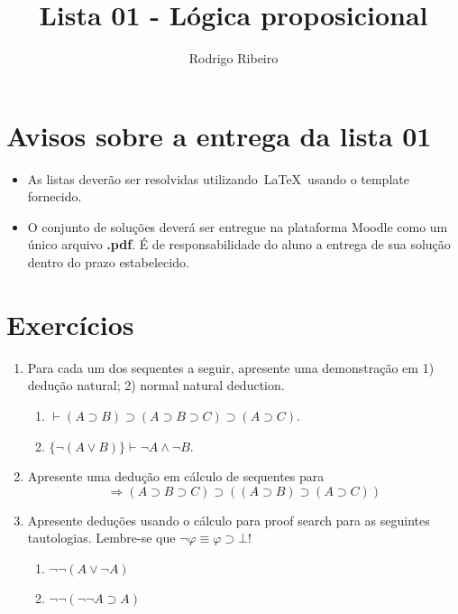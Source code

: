 \documentclass[a4paper]{article}
\theoremstyle{definition}
\begin{document}
  \title{Lista 01 - Lógica proposicional}
  \author{Rodrigo Ribeiro}

  \maketitle


  \pagestyle{fancy}

  \section*{Avisos sobre a entrega da lista 01}

  \begin{itemize}
    \item As listas deverão ser resolvidas utilizando~\LaTeX~usando o template fornecido.
    \item O conjunto de soluções deverá ser entregue na plataforma Moodle como um único
        arquivo \textbf{.pdf}. É de responsabilidade do aluno a entrega de sua solução dentro do
        prazo estabelecido.
  \end{itemize}

  \section*{Exercícios}

  \begin{enumerate}
    \item Para cada um dos sequentes a seguir, apresente uma demonstração em 1) dedução natural; 2) normal natural deduction.
          \begin{enumerate}
            \item $\vdash (A \supset B) \supset (A \supset B \supset C) \supset (A \supset C)$.
            \item $\{\neg (A\lor B)\} \vdash \neg A \land \neg B$.
          \end{enumerate}
    \item Apresente uma dedução em cálculo de sequentes para
          \[
            \Longrightarrow (A \supset B \supset C) \supset ((A \supset B) \supset (A \supset C))
          \]

    \item Apresente deduções usando o cálculo para proof search para as seguintes tautologias.
          Lembre-se que $\neg \varphi \equiv \varphi \supset \bot$!
          \begin{enumerate}
            \item $\neg \neg (A \lor \neg A)$
            \item $\neg \neg (\neg \neg A \supset A)$
          \end{enumerate}
  \end{enumerate}
\end{document}
